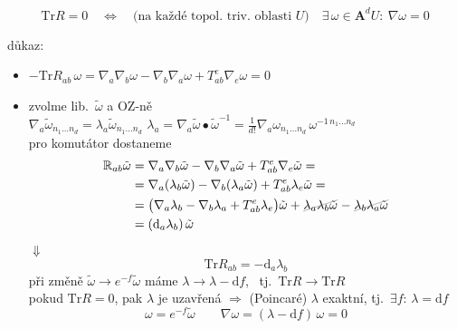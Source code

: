 \begin{veta}
\[
  \mathrm{Tr}R = 0
  \quad\Longleftrightarrow\quad
  \text{(na každé topol.\ triv.\ oblasti $U$)}\quad \exists\,\omega\in\mathbf{A}^d U:\ \nabla\omega = 0
\]
\end{veta}
důkaz:
\begin{itemize}[nosep]
  \item[$\Uparrow$] $\displaystyle -\mathrm{Tr}R_{ab}\,\omega = \nabla_a\nabla_b\omega - \nabla_b\nabla_a\omega + T^{e}_{ab}\nabla_e\omega = 0$
  \item[$\Downarrow$] zvolme lib.\ $\tilde\omega$ a OZ-ně \\
        $\nabla_a\tilde\omega_{n_1\dots n_d} = \lambda_a\tilde\omega_{n_1\dots n_d}$
        \qquad $\lambda_a = \nabla_a\tilde\omega\bullet\tilde\omega^{-1} = \frac{1}{d!}\nabla_a\omega_{n_1\dots n_d}\,\omega^{-1\,n_1\dots n_d}$ \\
        pro komutátor dostaneme
        \begin{align*}
          \gmIjedenactAR_{ab}\tilde\omega &= \nabla_a\nabla_b\tilde\omega - \nabla_b\nabla_a\tilde\omega + T^{e}_{ab}\nabla_e\tilde\omega = \\
          &= \nabla_a(\lambda_b\tilde\omega) - \nabla_b(\lambda_a\tilde\omega) + T^{e}_{ab}\lambda_e\tilde\omega = \\
          &= \big(\nabla_a\lambda_b - \nabla_b\lambda_a + T^{e}_{ab}\lambda_e\big)\tilde\omega + \gmIjedenactAx{\lambda_a\lambda_b\tilde\omega} - \gmIjedenactAx{\lambda_b\lambda_a\tilde\omega} \\
          &= (\mathrm{d}_a\lambda_b)\,\tilde\omega
        \end{align*}
        $\Downarrow$
        \[
          \mathrm{Tr}R_{ab} = -\mathrm{d}_a\lambda_b
        \]
        při změně $\tilde\omega\to e^{-f}\tilde\omega$ máme $\lambda\to\lambda - \mathrm{d}f$, \ tj.\ $\mathrm{Tr}R\to\mathrm{Tr}R$ \\
        pokud $\mathrm{Tr}R = 0$, pak $\lambda$ je uzavřená $\Rightarrow$ (Poincaré) $\lambda$ exaktní, tj.\ $\exists f$: $\lambda = \mathrm{d}f$
        \[
          \omega = e^{-f}\tilde\omega \qquad \nabla\omega = (\lambda - \mathrm{d}f)\,\omega = 0
        \]
\end{itemize}

